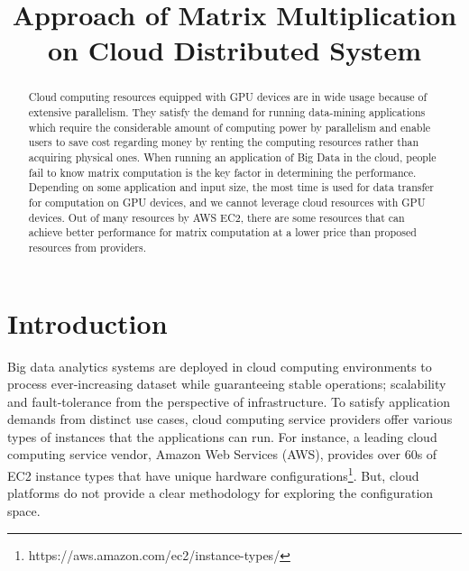 \documentclass[10pt, conference, compsocconf]{IEEEtran}
\begin{document}

\title{Approach of Matrix Multiplication on Cloud Distributed System}


\author{
\and
{}
}

\maketitle

\begin{abstract}
Cloud computing resources equipped with GPU devices are in wide usage because of extensive parallelism. They satisfy the demand for running data-mining applications which require the considerable amount of computing power by parallelism and enable users to save cost regarding money by renting the computing resources rather than acquiring physical ones.
    When running an application of Big Data in the cloud, people fail to know matrix computation is the key factor in determining the performance. Depending on some application and input size, the most time is used for data transfer for computation on GPU devices, and we cannot leverage cloud resources with GPU devices. Out of many resources by AWS EC2, there are some resources that can achieve better performance for matrix computation at a lower price than proposed resources from providers.
\end{abstract}

\IEEEpeerreviewmaketitle

\section{Introduction}\label{sec:intro}
Big data analytics systems are deployed in cloud computing environments to process ever-increasing dataset while guaranteeing stable operations; scalability and fault-tolerance from the perspective of infrastructure. To satisfy application demands from distinct use cases, cloud computing service providers offer various types of instances that the applications can run. For instance, a leading cloud computing service vendor, Amazon Web Services (AWS), provides over 60s of EC2 instance types that have unique hardware configurations\footnote{https://aws.amazon.com/ec2/instance-types/}. But, cloud platforms do not provide a clear methodology for exploring the configuration space.
\end{document}
